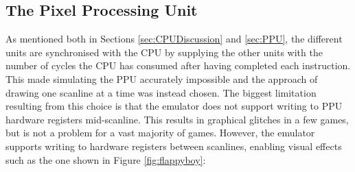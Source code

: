 \subsection{The Pixel Processing Unit}
As mentioned both in Sections \ref{sec:CPUDiscussion} and \ref{sec:PPU}, the different units are synchronised with the CPU by supplying the other units with the number of cycles the CPU has consumed after having completed each instruction. This made simulating the PPU accurately impossible and the approach of drawing one scanline at a time was instead chosen. The biggest limitation resulting from this choice is that the emulator does not support writing to PPU hardware registers mid-scanline. This results in graphical glitches in a few games, but is not a problem for a vast majority of games. However, the emulator supports writing to hardware registers between scanlines, enabling visual effects such as the one shown in Figure \ref{fig:flappyboy}:


